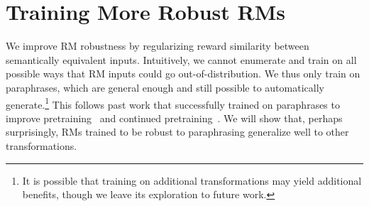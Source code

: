 \section{Training More Robust RMs} \label{sec:training}

We improve RM robustness by regularizing reward similarity between semantically equivalent inputs.
Intuitively, we cannot enumerate and train on all possible ways that RM inputs could go out-of-distribution.
We thus only train on paraphrases, which are general enough and still possible to automatically generate.\footnote{It is possible that training on additional transformations may yield additional benefits, though we leave its exploration to future work.}
This follows past work that successfully trained on paraphrases to improve pretraining~\citep{maini-etal-2024-rephrasing} and continued pretraining~\citep{yang2025synthetic}.
We will show that, perhaps surprisingly, RMs trained to be robust to paraphrasing generalize well to other transformations.

